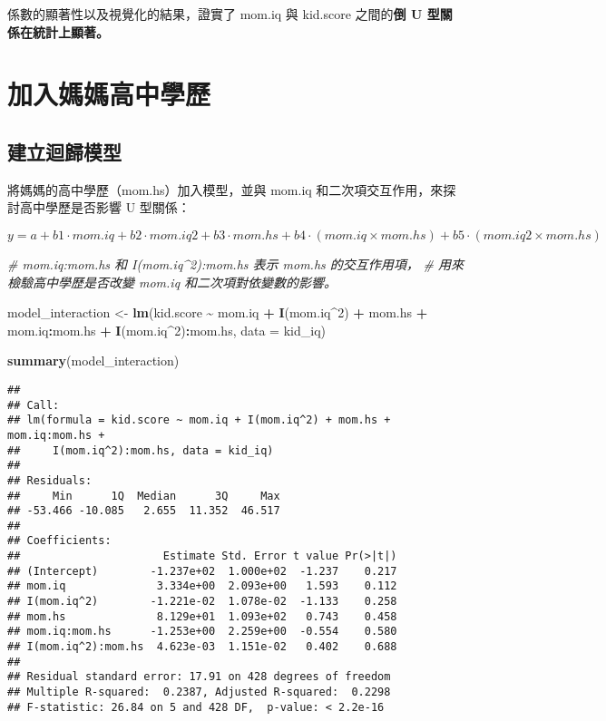 \documentclass[
]{article}
\newenvironment{Shaded}{\begin{snugshade}}{\end{snugshade}}
\newcommand{\AttributeTok}[1]{\textcolor[rgb]{0.13,0.29,0.53}{#1}}
\newcommand{\CommentTok}[1]{\textcolor[rgb]{0.56,0.35,0.01}{\textit{#1}}}
\newcommand{\DecValTok}[1]{\textcolor[rgb]{0.00,0.00,0.81}{#1}}
\newcommand{\FunctionTok}[1]{\textcolor[rgb]{0.13,0.29,0.53}{\textbf{#1}}}
\newcommand{\NormalTok}[1]{#1}
\newcommand{\OtherTok}[1]{\textcolor[rgb]{0.56,0.35,0.01}{#1}}
\newcommand{\SpecialCharTok}[1]{\textcolor[rgb]{0.81,0.36,0.00}{\textbf{#1}}}
\begin{document}
係數的顯著性以及視覺化的結果，證實了 mom.iq 與 kid.score
之間的\textbf{倒 U 型關係在統計上顯著。}

\section{加入媽媽高中學歷}\label{ux52a0ux5165ux5abdux5abdux9ad8ux4e2dux5b78ux6b77}

\subsection{建立迴歸模型}\label{ux5efaux7acbux8ff4ux6b78ux6a21ux578b}

將媽媽的高中學歷（mom.hs）加入模型，並與 mom.iq
和二次項交互作用，來探討高中學歷是否影響 U 型關係：

\(y=a+b1​⋅mom.iq+b2​⋅mom.iq2+b3​⋅mom.hs+b4​⋅(mom.iq×mom.hs)+b5​⋅(mom.iq2×mom.hs)\)

\begin{Shaded}
\begin{Highlighting}[]
\CommentTok{\# mom.iq:mom.hs 和 I(mom.iq\^{}2):mom.hs 表示 mom.hs 的交互作用項，}
\CommentTok{\# 用來檢驗高中學歷是否改變 mom.iq 和二次項對依變數的影響。}

\NormalTok{model\_interaction }\OtherTok{\textless{}{-}} \FunctionTok{lm}\NormalTok{(kid.score }\SpecialCharTok{\textasciitilde{}}\NormalTok{ mom.iq }\SpecialCharTok{+} \FunctionTok{I}\NormalTok{(mom.iq}\SpecialCharTok{\^{}}\DecValTok{2}\NormalTok{) }\SpecialCharTok{+}\NormalTok{ mom.hs }\SpecialCharTok{+}\NormalTok{ mom.iq}\SpecialCharTok{:}\NormalTok{mom.hs }\SpecialCharTok{+} \FunctionTok{I}\NormalTok{(mom.iq}\SpecialCharTok{\^{}}\DecValTok{2}\NormalTok{)}\SpecialCharTok{:}\NormalTok{mom.hs, }\AttributeTok{data =}\NormalTok{ kid\_iq)}

\FunctionTok{summary}\NormalTok{(model\_interaction)}
\end{Highlighting}
\end{Shaded}

\begin{verbatim}
## 
## Call:
## lm(formula = kid.score ~ mom.iq + I(mom.iq^2) + mom.hs + mom.iq:mom.hs + 
##     I(mom.iq^2):mom.hs, data = kid_iq)
## 
## Residuals:
##     Min      1Q  Median      3Q     Max 
## -53.466 -10.085   2.655  11.352  46.517 
## 
## Coefficients:
##                      Estimate Std. Error t value Pr(>|t|)
## (Intercept)        -1.237e+02  1.000e+02  -1.237    0.217
## mom.iq              3.334e+00  2.093e+00   1.593    0.112
## I(mom.iq^2)        -1.221e-02  1.078e-02  -1.133    0.258
## mom.hs              8.129e+01  1.093e+02   0.743    0.458
## mom.iq:mom.hs      -1.253e+00  2.259e+00  -0.554    0.580
## I(mom.iq^2):mom.hs  4.623e-03  1.151e-02   0.402    0.688
## 
## Residual standard error: 17.91 on 428 degrees of freedom
## Multiple R-squared:  0.2387, Adjusted R-squared:  0.2298 
## F-statistic: 26.84 on 5 and 428 DF,  p-value: < 2.2e-16
\end{verbatim}
\end{document}
